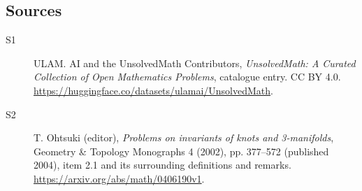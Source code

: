 \documentclass[11pt]{article}
\begin{document}
\subsection{Sources}
\begin{description}
\item[\hypertarget{source:statement:1}{S1}] ULAM. AI and the UnsolvedMath Contributors, \emph{UnsolvedMath: A Curated Collection of Open Mathematics Problems}, catalogue entry. CC BY 4.0. \url{https://huggingface.co/datasets/ulamai/UnsolvedMath}.
\item[\hypertarget{source:statement:2}{S2}] T. Ohtsuki (editor), \emph{Problems on invariants of knots and 3-manifolds}, Geometry \& Topology Monographs 4 (2002), pp. 377--572 (published 2004), item 2.1 and its surrounding definitions and remarks. \url{https://arxiv.org/abs/math/0406190v1}.
\end{description}
\label{end:statement}
\end{document}
